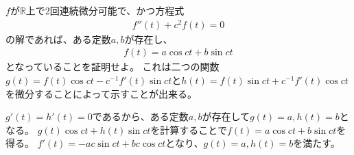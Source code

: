 \begin{renshu}
$f$が$\mathbb{R}$上で2回連続微分可能で、かつ方程式
\begin{align}
f''(t)+c^2 f(t)=0
\end{align}
の解であれば、ある定数$a,b$が存在し、
\begin{align}
f(t)=a\cos ct + b\sin ct
\end{align}
となっていることを証明せよ。
これは二つの関数$g(t)=f(t)\cos ct - c^{-1}f'(t)\sin ct$と$h(t)=f(t)\sin ct + c^{-1}f'(t)\cos ct$を微分することによって示すことが出来る。
\end{renshu}

\begin{kaitou*}
$g'(t)=h'(t)=0$であるから、ある定数$a,b$が存在して$g(t)=a,h(t)=b$となる。
$g(t)\cos ct+h(t)\sin ct$を計算することで$f(t)=a\cos ct+b\sin ct$を得る。
$f'(t)=-ac\sin ct+bc\cos ct$となり、$g(t)=a,h(t)=b$を満たす。
\end{kaitou*}